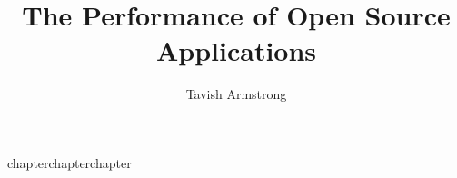 \documentclass{book}
\author{Tavish Armstrong}
\title{The Performance of Open Source Applications}
\date{}
\makeatletter
\def\cleardoublepage{\clearpage\if@twoside \ifodd\c@page\else
    \hbox{}
    \thispagestyle{plain}
    \newpage
    \if@twocolumn\hbox{}\newpage\fi\fi\fi}
\makeatother
\begin{document}
\frontmatter


\tableofcontents



\mainmatter


chapterchapterchapter






\makeatletter
\@openrightfalse
\makeatother

\backmatter


\end{document}
